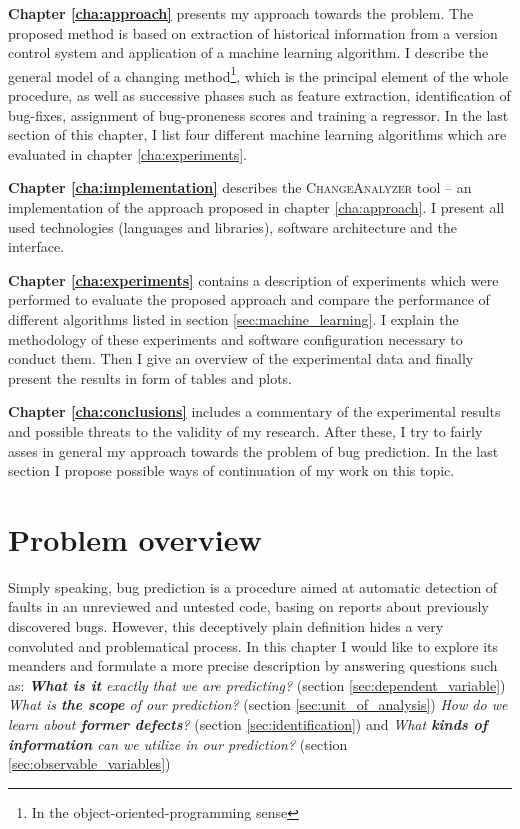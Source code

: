 \documentclass{pracamgr}
\begin{document}
\medskip \noindent
\textbf{Chapter \ref{cha:approach}} presents my approach towards the problem. The proposed method is based on extraction of historical information from a version control system and application of a machine learning algorithm. I describe the general model of a changing method\footnote{In the object-oriented-programming sense}, which is the principal element of the whole procedure, as well as successive phases such as feature extraction, identification of bug-fixes, assignment of bug-proneness scores and training a regressor. In the last section of this chapter, I list four different machine learning algorithms which are evaluated in chapter \ref{cha:experiments}.

\medskip \noindent
\textbf{Chapter \ref{cha:implementation}} describes the \textsc{ChangeAnalyzer} tool -- an implementation of the approach proposed in chapter \ref{cha:approach}. I present all used technologies (languages and libraries), software architecture and the interface.

\medskip \noindent
\textbf{Chapter \ref{cha:experiments}} contains a description of experiments which were performed to evaluate the proposed approach and compare the performance of different algorithms listed in section \ref{sec:machine_learning}. I explain the methodology of these experiments and software configuration necessary to conduct them. Then I give an overview of the experimental data and finally present the results in form of tables and plots.

\medskip \noindent
\textbf{Chapter \ref{cha:conclusions}} includes a commentary of the experimental results and possible threats to the validity of my research. After these, I try to fairly asses in general my approach towards the problem of bug prediction. In the last section I propose possible ways of continuation of my work on this topic.

\chapter{Problem overview}
\label{cha:overview}
Simply speaking, bug prediction is a procedure aimed at automatic detection of faults in an unreviewed and untested code, basing on reports about previously discovered bugs. However, this deceptively plain definition hides a very convoluted and problematical process. In this chapter I would like to explore its meanders and formulate a more precise description by answering questions such as: \emph{\textbf{What is it} exactly that we are predicting?} (section \ref{sec:dependent_variable}) \emph{What is \textbf{the scope} of our prediction?} (section \ref{sec:unit_of_analysis}) \emph{How do we learn about \textbf{former defects}?} (section \ref{sec:identification}) and \emph{What \textbf{kinds of information} can we utilize in our prediction?} (section \ref{sec:observable_variables})
\end{document}

